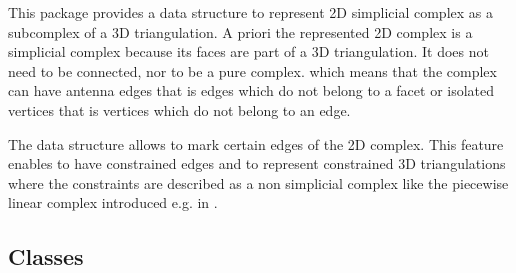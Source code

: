 \label{ref_chapter_Complex2inTriangulation3}
\label{ref_chapter_C2inT3}

\vspace*{-15mm}
\minitoc
\vspace*{30mm}

This package provides a data structure to  represent 
2D simplicial complex as a subcomplex of a 3D triangulation.
A priori the represented 2D complex is a  simplicial complex
because its faces are part of a 3D triangulation.
It does not need to be connected, nor to be a pure complex.
which  means that the complex can have antenna edges 
that is edges which do not belong to a facet or
isolated vertices that is vertices  which do not belong to
an edge.

The data structure allows to mark certain edges of the 2D complex.
This feature enables  to have  constrained edges
and to represent constrained 3D triangulations
where the constraints are described 
as a non simplicial complex like the piecewise linear complex
introduced  e.g. in \cite{s-cgehd-98}.

\subsection*{Classes}
